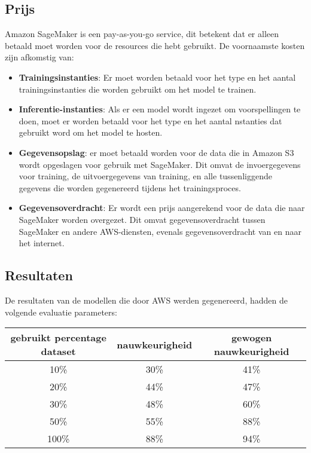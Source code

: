 \subsection{Prijs}
Amazon SageMaker is een pay-as-you-go service, dit betekent dat er alleen betaald moet worden voor de resources die hebt gebruikt. De voornaamste kosten zijn afkomstig van:
\begin{itemize}
    \item \textbf{Trainingsinstanties}: Er moet worden betaald voor het type en het aantal trainingsinstanties die worden gebruikt om het model te trainen.
    
    \item \textbf{ Inferentie-instanties}: Als er een model wordt ingezet om voorspellingen te doen, moet er worden betaald voor het type en het aantal nstanties dat gebruikt word om het model te hosten.
    
    \item \textbf{Gegevensopslag}: er moet betaald worden voor de data die in Amazon S3 wordt opgeslagen voor gebruik met SageMaker. Dit omvat de invoergegevens voor training, de uitvoergegevens van training, en alle tussenliggende gegevens die worden gegenereerd tijdens het trainingsproces.
    
    \item\textbf{ Gegevensoverdracht}: Er wordt een prijs aangerekend voor de data die naar SageMaker worden overgezet. Dit omvat gegevensoverdracht tussen SageMaker en andere AWS-diensten, evenals gegevensoverdracht van en naar het internet.
\end{itemize}


\subsection{Resultaten}
De resultaten van de modellen die door AWS werden gegenereerd, hadden de volgende evaluatie parameters:
\begin{center}
    \begin{tabular} {|c | c | c |}
        \hline
        gebruikt percentage dataset & nauwkeurigheid & gewogen nauwkeurigheid \\
        \hline
        10\% & 30\% & 41\% \\
        \hline
        20\% & 44\% & 47\% \\
        \hline
         30\% & 48\% & 60\% \\
        \hline
         50\% & 55\% & 88\% \\
        \hline
         100\% & 88\% & 94\% \\
        \hline
    \end{tabular}
\end{center}


